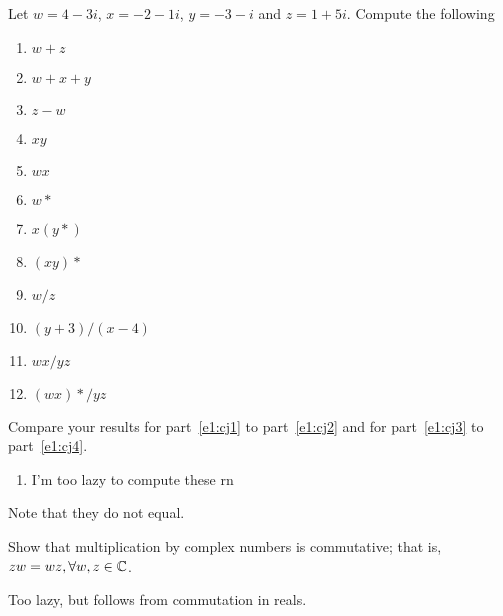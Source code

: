 \begin{exercise}
	Let \(w=4-3i\), \(x=-2-1i\), \(y=-3-i\) and \(z=1+5i\). Compute the following
	\begin{multicols}{3}
	\begin{enumerate}[label = (\alph*)]
		\item \(w+z\)
		\item \(w+x+y\)
		\item \(z-w\)
		\item \(xy\)
		\item \(wx\)
		\item \(w\ast\)
		\item\label{e1:cj1} \(x(y\ast)\)
		\item\label{e1:cj2} \((xy)\ast\)
		\item \(w/z\)
		\item \((y+3)/(x-4)\)
		\item\label{e1:cj3} \(wx/yz\)
		\item\label{e1:cj4} \((wx)\ast/yz\)
	\end{enumerate}
	\end{multicols}
	Compare your results for part~\ref{e1:cj1} to part~\ref{e1:cj2} and for part~\ref{e1:cj3} to part~\ref{e1:cj4}.
\begin{solution}
	\begin{enumerate}[label = (\alph*)]
		\item I'm too lazy to compute these rn
	\end{enumerate}
	Note that they do not equal.
\end{solution}
\end{exercise}
\begin{exercise}
	Show that multiplication by complex numbers is commutative; that is, \(zw=wz, \forall w,z\in \mathbb{C}\).
\begin{solution}
	Too lazy, but follows from commutation in reals.
\end{solution}
\end{exercise}

